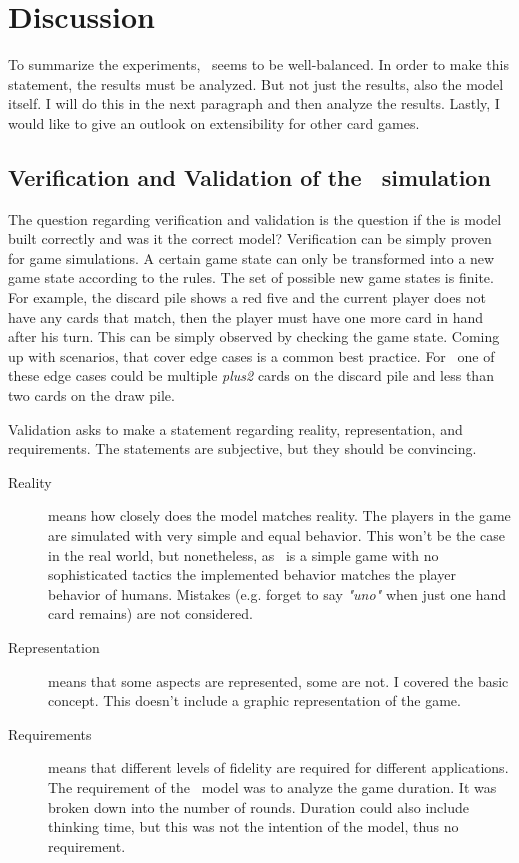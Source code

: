 

\section{Discussion}

To summarize the experiments, \uno\ seems to be well-balanced. In order to make this statement, the results must be analyzed. But not just the results, also the model itself. I will do this in the next paragraph and then analyze the results. Lastly, I would like to give an outlook on extensibility for other card games.


\subsection{Verification and Validation of the \uno\ simulation}

The question regarding verification and validation is the question if the is model built correctly and was it the correct model?
Verification can be simply proven for game simulations. A certain game state can only be transformed into a new game state according to the rules. The set of possible new game states is finite. For example, the discard pile shows a red five and the current player does not have any cards that match, then the player must have one more card in hand after his turn. This can be simply observed by checking the game state. Coming up with scenarios, that cover edge cases is a common best practice. For \uno\ one of these edge cases could be multiple \textit{plus2} cards on the discard pile and less than two cards on the draw pile.

Validation asks to make a statement regarding reality, representation, and requirements. \cite[page 13]{sokolowski2010modelingintro} The statements are subjective, but they should be convincing.

\begin{description}
\item[Reality] means how closely does the model matches reality. The players in the game are simulated with very simple and equal behavior.  This won't be the case in the real world, but nonetheless, as \uno\ is a simple game with no sophisticated tactics the implemented behavior matches the player behavior of humans. Mistakes (e.g. forget to say \textit{"uno"} when just one hand card remains) are not considered.

\item[Representation] means that some aspects are represented, some are not. I covered the basic concept. This doesn't include a graphic representation of the game.

\item [Requirements] means that different levels of fidelity are required for different applications. The requirement of the \uno\ model was to analyze the game duration. It was broken down into the number of rounds. Duration could also include thinking time, but this was not the intention of the model, thus no requirement.

\end{description}

